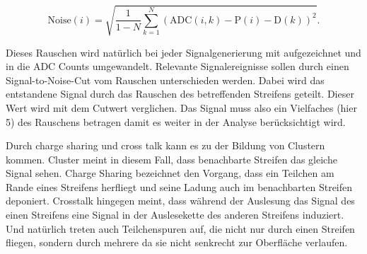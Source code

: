 \begin{equation}
  \label{eqn:noise}
  \mathup{Noise}(i) = \sqrt{ \frac{1}{1 - N}  \sum^N_{k = 1} ( \mathup{ADC}(i,k) - \mathup{P}(i) - \mathup{D}(k))^2  }.
\end{equation}

Dieses Rauschen wird natürlich bei jeder Signalgenerierung mit aufgezeichnet und in die ADC Counts umgewandelt.
Relevante Signalereignisse sollen durch einen Signal-to-Noise-Cut vom Rauschen unterschieden werden.
Dabei wird das entstandene Signal durch das Rauschen des betreffenden Streifens geteilt.
Dieser Wert wird mit dem Cutwert verglichen.
Das Signal muss also ein Vielfaches (hier 5) des Rauschens betragen damit es weiter in der Analyse berücksichtigt wird.

Durch charge sharing und cross talk kann es zu der Bildung von Clustern kommen.
Cluster meint in diesem Fall, dass benachbarte Streifen das gleiche Signal sehen.
Charge Sharing bezeichnet den Vorgang, dass ein Teilchen am Rande eines Streifens herfliegt und seine Ladung auch im benachbarten Streifen deponiert.
Crosstalk hingegen meint, dass während der Auslesung das Signal des einen Streifens eine Signal in der Auslesekette des anderen Streifens induziert.
Und natürlich treten auch Teilchenspuren auf, die nicht nur durch einen Streifen fliegen, sondern durch mehrere da sie nicht senkrecht zur Oberfläche verlaufen.


















%
